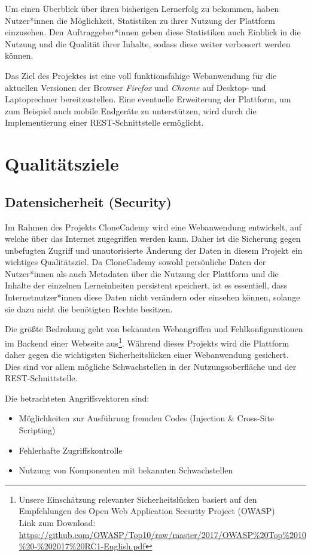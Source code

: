 \documentclass[accentcolor=tud0b,12pt,paper=a4]{tudreport}
\begin{document}
Um einen Überblick über ihren bisherigen Lernerfolg zu bekommen, haben Nutzer*innen die Möglichkeit, Statistiken zu ihrer Nutzung der Plattform einzusehen. Den Auftraggeber*innen geben diese Statistiken auch Einblick in die Nutzung und die Qualität ihrer Inhalte, sodass diese weiter verbessert werden können.

Das Ziel des Projektes ist eine voll funktionsfähige Webanwendung für die aktuellen Versionen der Browser \emph{Firefox} und \emph{Chrome} auf Desktop- und Laptoprechner bereitzustellen. Eine eventuelle Erweiterung der Plattform, um zum Beispiel auch mobile Endgeräte zu unterstützen, wird durch die Implementierung einer REST-Schnittstelle ermöglicht.


\chapter{Qualitätsziele}
\section{Datensicherheit (Security)}

Im Rahmen des Projekts CloneCademy wird eine Webanwendung entwickelt, auf welche über das Internet zugegriffen werden kann. Daher ist die Sicherung gegen unbefugten Zugriff und unautorisierte Änderung der Daten in diesem Projekt ein wichtiges Qualitätsziel. Da CloneCademy sowohl persönliche Daten der Nutzer*innen als auch Metadaten über die Nutzung der Plattform und die Inhalte der einzelnen Lerneinheiten persistent speichert, ist es essentiell, dass Internetnutzer*innen diese Daten nicht verändern oder einsehen können, solange sie dazu nicht die benötigten Rechte besitzen.

Die größte Bedrohung geht von bekannten Webangriffen und Fehlkonfigurationen im Backend einer Webseite aus\footnote{Unsere Einschätzung relevanter Sicherheitslücken basiert auf den Empfehlungen des Open Web Application Security Project (OWASP)\\Link zum Download:  \href{https://github.com/OWASP/Top10/raw/master/2017/OWASP\%20Top\%2010\%20-\%202017\%20RC1-English.pdf}{https://github.com/OWASP/Top10/raw/master/2017/OWASP\%20Top\%2010\%20-\%202017\%20RC1-English.pdf}}. Während dieses Projekts wird die Plattform daher gegen die wichtigsten Sicherheitslücken einer Webanwendung gesichert. Dies sind vor allem mögliche Schwachstellen in der Nutzungsoberfläche und der REST-Schnittstelle.

Die betrachteten Angriffsvektoren sind:
\begin{itemize}
\item Möglichkeiten zur Ausführung fremden Codes (Injection \& Cross-Site Scripting)
\item Fehlerhafte Zugriffskontrolle
\item Nutzung von Komponenten mit bekannten Schwachstellen
\end{itemize}
\end{document}
